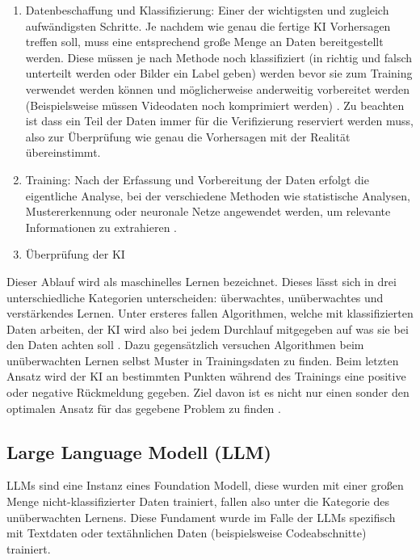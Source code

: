 \documentclass[11pt,a4paper]{report}
\begin{document}
\begin{enumerate}
    \item \label{item:Data} Datenbeschaffung und Klassifizierung: Einer der wichtigsten und zugleich aufwändigsten Schritte. Je nachdem wie genau die fertige KI Vorhersagen treffen soll, muss eine entsprechend große Menge an Daten bereitgestellt werden. Diese müssen je nach Methode noch klassifiziert (in richtig und falsch unterteilt werden oder Bilder ein Label geben) werden bevor sie zum Training verwendet werden können und möglicherweise anderweitig vorbereitet werden (Beispielsweise müssen Videodaten noch komprimiert werden) \cite{schmidt}. Zu beachten ist dass ein Teil der Daten immer für die Verifizierung reserviert werden muss, also zur Überprüfung wie genau die Vorhersagen mit der Realität übereinstimmt.
    \item Training: Nach der Erfassung und Vorbereitung der Daten erfolgt die eigentliche Analyse, bei der verschiedene Methoden wie statistische Analysen, Mustererkennung oder neuronale Netze angewendet werden, um relevante Informationen zu extrahieren \cite{schmidt}.
    \item Überprüfung der KI
\end{enumerate}

Dieser Ablauf wird als maschinelles Lernen bezeichnet. Dieses lässt sich in drei unterschiedliche Kategorien unterscheiden: überwachtes, unüberwachtes und verstärkendes Lernen. Unter ersteres fallen Algorithmen, welche mit klassifizierten Daten arbeiten, der KI wird also bei jedem Durchlauf mitgegeben auf was sie bei den Daten achten soll \cite{schmidt}.
Dazu gegensätzlich versuchen Algorithmen beim unüberwachten Lernen selbst Muster in Trainingsdaten zu finden. Beim letzten Ansatz wird der KI an bestimmten Punkten während des Trainings eine positive oder negative Rückmeldung gegeben. Ziel davon ist es nicht nur einen sonder den optimalen Ansatz für das gegebene Problem zu finden \cite{schmidt}.




\subsection{Large Language Modell (LLM)}

LLMs sind eine Instanz eines Foundation Modell, diese wurden mit einer großen Menge nicht-klassifizierter Daten trainiert, fallen also unter die Kategorie des unüberwachten Lernens. Diese \glqq Fundament \grqq{} wurde im Falle der LLMs spezifisch mit Textdaten oder textähnlichen Daten (beispielsweise Codeabschnitte) trainiert.
\end{document}
